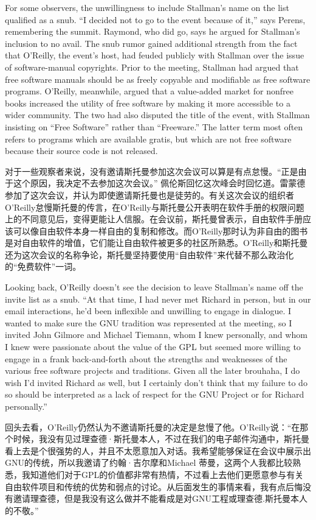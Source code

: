 \ifdefined\eng
For some observers, the unwillingness to include Stallman's name on the list qualified as a snub. ``I decided not to go to the event because of it,'' says Perens, remembering the summit. Raymond, who did go, says he argued for Stallman's inclusion to no avail. The snub rumor gained additional strength from the fact that O'Reilly, the event's host, had feuded publicly with Stallman over the issue of software-manual copyrights. Prior to the meeting, Stallman had argued that free software manuals should be as freely copyable and modifiable as free software programs. O'Reilly, meanwhile, argued that a value-added market for nonfree books increased the utility of free software by making it more accessible to a wider community. The two had also disputed the title of the event, with Stallman insisting on ``Free Software'' rather than ``Freeware.''  The latter term most often refers to programs which are available gratis, but which are not free software because their source code is not released.
\fi

\ifdefined\chs
对于一些观察者来说，没有邀请斯托曼参加这次会议可以算是有点怠慢。“正是由于这个原因，我决定不去参加这次会议。” 佩伦斯回忆这次峰会时回忆道。雷蒙德参加了这次会议，并认为即使邀请斯托曼也是徒劳的。有关这次会议的组织者O'Reilly怠慢斯托曼的传言，在O'Reilly与斯托曼公开表明在软件手册的权限问题上的不同意见后，变得更能让人信服。在会议前，斯托曼曾表示，自由软件手册应该可以像自由软件本身一样自由的复制和修改。而O'Reilly那时认为非自由的图书是对自由软件的增值，它们能让自由软件被更多的社区所熟悉。O'Reilly和斯托曼还为这次会议的名称争论，斯托曼坚持要使用“自由软件”来代替不那么政治化的“免费软件”一词。
\fi

\ifdefined\eng
Looking back, O'Reilly doesn't see the decision to leave Stallman's name off the invite list as a snub. ``At that time, I had never met Richard in person, but in our email interactions, he'd been inflexible and unwilling to engage in dialogue. I wanted to make sure the GNU tradition was represented at the meeting, so I invited John Gilmore and Michael Tiemann, whom I knew personally, and whom I knew were passionate about the value of the GPL but seemed more willing to engage in a frank back-and-forth about the strengths and weaknesses of the various free software projects and traditions. Given all the later brouhaha, I do wish I'd invited Richard as well, but I certainly don't think that my failure to do so should be interpreted as a lack of respect for the GNU Project or for Richard personally.''
\fi

\ifdefined\chs
回头去看，O'Reilly仍然认为不邀请斯托曼的决定是怠慢了他。O’Reilly说：“在那个时候，我没有见过理查德·斯托曼本人，不过在我们的电子邮件沟通中，斯托曼看上去是个很强势的人，并且不太愿意加入对话。我希望能够保证在会议中展示出GNU的传统，所以我邀请了约翰·吉尔摩和Michael 蒂曼，这两个人我都比较熟悉，我知道他们对于GPL的价值都非常有热情，不过看上去他们更愿意参与有关自由软件项目和传统的优势和弱点的讨论。从后面发生的事情来看，我有点后悔没有邀请理查德，但是我没有这么做并不能看成是对GNU工程或理查德.斯托曼本人的不敬。”
\fi


